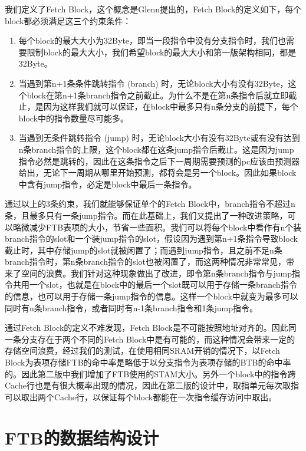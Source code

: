 我们定义了Fetch Block，这个概念是Glenn\cite{scalable-frontend}提出的，Fetch Block的定义如下，每个block都必须满足这三个约束条件：

\begin{enumerate}
    \item 每个block的最大大小为32Byte，即当一段指令中没有分支指令时，我们也需要限制block的最大大小，我们希望block的最大大小和第一版架构相同，都是32Byte。
    \item 当遇到第n+1条条件跳转指令 (branch) 时，无论block大小有没有32Byte，这个block在第n+1条branch指令之前截止。为什么不是在第n条指令后就立即截止，是因为这样我们就可以保证，在block中最多只有n条分支的前提下，每个block中的指令数量尽可能多。
    \item 当遇到无条件跳转指令 (jump) 时，无论block大小有没有32Byte或有没有达到n条branch指令的上限，这个block都在这条jump指令后截止。这是因为jump指令必然是跳转的，因此在这条指令之后下一周期需要预测的pc应该由预测器给出，无论下一周期从哪里开始预测，都将会是另一个block。因此如果block中含有jump指令，必定是block中最后一条指令。
\end{enumerate}

通过以上的3条约束，我们就能够保证单个的Fetch Block中，branch指令不超过n条，且最多只有一条jump指令。而在此基础上，我们又提出了一种改进策略，可以略微减少FTB表项的大小，节省一些面积。我们可以将每个block中看作有n个装branch指令的slot和一个装jump指令的slot，假设因为遇到第n+1条指令导致block截止时，其中存储jump的slot就被闲置了；而遇到jump指令，且之前不足n条branch指令时，第n条branch指令的slot也被闲置了，而这两种情况非常常见，带来了空间的浪费。我们针对这种现象做出了改进，即令第n条branch指令与jump指令共用一个slot，也就是在block中的最后一个slot既可以用于存储一条branch指令的信息，也可以用于存储一条jump指令的信息。这样一个block中就变为最多可以同时有n条branch指令，或者同时有n-1条branch指令和1条jump指令。

通过Fetch Block的定义不难发现，Fetch Block是不可能按照地址对齐的。因此同一条分支存在于两个不同的Fetch Block中是有可能的，而这种情况会带来一定的存储空间浪费，经过我们的测试，在使用相同SRAM开销的情况下，以Fetch Block为表项存储FTB的命中率是略低于以分支指令为表项存储的BTB的命中率的。因此第二版中我们增加了FTB使用的STAM大小。另外一个block中的指令跨Cache行也是有很大概率出现的情况，因此在第二版的设计中，取指单元每次取指可以取出两个Cache行，以保证每个block都能在一次指令缓存访问中取出。

\section{FTB的数据结构设计}

